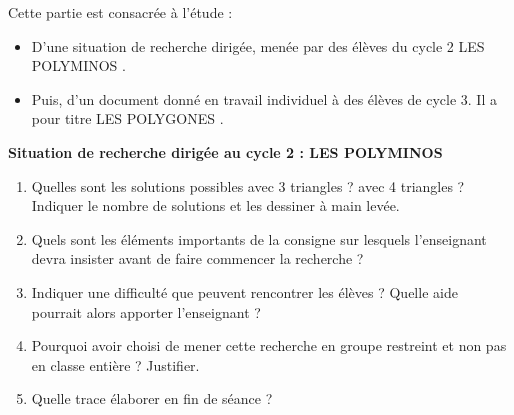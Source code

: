 \begin{exercice}
Cette partie est consacrée à l'étude :
\begin{itemize}
   \item D'une situation de recherche dirigée, menée par des élèves du cycle 2 \og LES POLYMINOS \fg.
   \item Puis, d'un document donné en travail individuel à des élèves de cycle 3. Il a pour titre \og LES POLYGONES \fg.
\end{itemize}

\smallskip

{\bf Situation de recherche dirigée au cycle 2 : LES POLYMINOS}

\begin{center}
\end{center}

\begin{enumerate}
   \item Quelles sont les solutions possibles avec 3 triangles ? avec 4 triangles ? \\
   Indiquer le nombre de solutions et les dessiner à main levée.
   \item Quels sont les éléments importants de la consigne sur lesquels l'enseignant devra insister avant de faire commencer la recherche ?
   \item Indiquer une difficulté que peuvent rencontrer les élèves ? Quelle aide pourrait alors apporter l'enseignant ?
   \item Pourquoi avoir choisi de mener cette recherche en groupe restreint et non pas en classe entière ? Justifier.
   \item Quelle trace élaborer en fin de séance ?
\end{enumerate}


\end{exercice}

